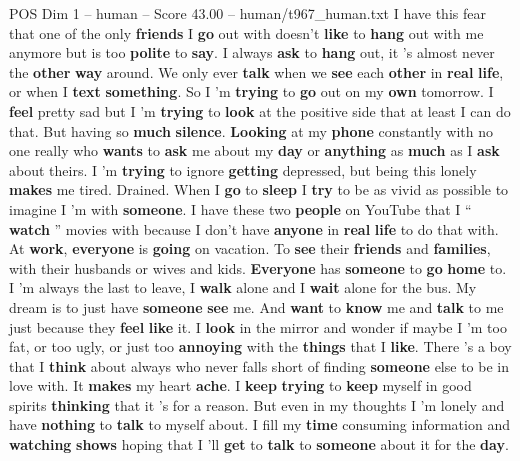 \begin{textsample}{POS Dim 1 – human – Score 43.00 – human/t967\_human.txt}  \label{ex:f1_pos_037}
I have this fear that one of the only \textbf{friends} I \textbf{go} out with doesn't \textbf{like} to \textbf{hang} out with me anymore but is too \textbf{polite} to \textbf{say}.
I always \textbf{ask} to \textbf{hang} out, it ’s almost never the \textbf{other} \textbf{way} around.
We only ever \textbf{talk} when we \textbf{see} each \textbf{other} in \textbf{real} \textbf{life}, or when I \textbf{text} \textbf{something}.
So I ’m \textbf{trying} to \textbf{go} out on my \textbf{own} tomorrow.
I \textbf{feel} pretty sad but I ’m \textbf{trying} to \textbf{look} at the positive side that at least I can do that.
But having so \textbf{much} \textbf{silence}. \textbf{Looking} at my \textbf{phone} constantly with no one really who \textbf{wants} to \textbf{ask} me about my \textbf{day} or \textbf{anything} as \textbf{much} as I \textbf{ask} about theirs.
I ’m \textbf{trying} to ignore \textbf{getting} depressed, but being this lonely \textbf{makes} me tired.
Drained.
When I \textbf{go} to \textbf{sleep} I \textbf{try} to be as vivid as possible to imagine I ’m with \textbf{someone}.
I have these two \textbf{people} on YouTube that I “ \textbf{watch} ” movies with because I don't have \textbf{anyone} in \textbf{real} \textbf{life} to do that with.
At \textbf{work}, \textbf{everyone} is \textbf{going} on vacation.
To \textbf{see} their \textbf{friends} and \textbf{families}, with their husbands or wives and kids. \textbf{Everyone} has \textbf{someone} to \textbf{go} \textbf{home} to.
I ’m always the last to leave, I \textbf{walk} alone and I \textbf{wait} alone for the bus.
My dream is to just have \textbf{someone} \textbf{see} me.
And \textbf{want} to \textbf{know} me and \textbf{talk} to me just because they \textbf{feel} \textbf{like} it.
I \textbf{look} in the mirror and wonder if maybe I ’m too fat, or too ugly, or just too \textbf{annoying} with the \textbf{things} that I \textbf{like}.
There ’s a boy that I \textbf{think} about always who never falls short of finding \textbf{someone} else to be in love with.
It \textbf{makes} my heart \textbf{ache}.
I \textbf{keep} \textbf{trying} to \textbf{keep} myself in good spirits \textbf{thinking} that it ’s for a reason.
But even in my thoughts I ’m lonely and have \textbf{nothing} to \textbf{talk} to myself about.
I fill my \textbf{time} consuming information and \textbf{watching} \textbf{shows} hoping that I ’ll \textbf{get} to \textbf{talk} to \textbf{someone} about it for the \textbf{day}.

\end{textsample}
